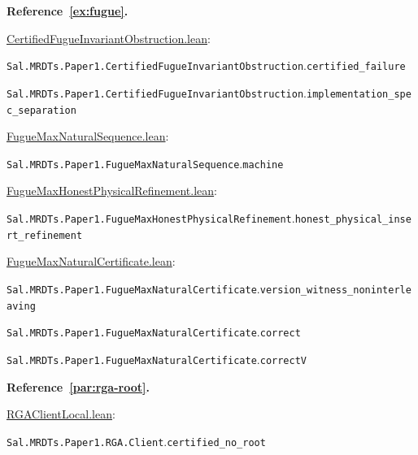 \medskip\noindent\textbf{Reference~\ref{ex:fugue}.}\par\nobreak
\noindent\href{https://github.com/fplaunchpad/sal/blob/paper1/Sal/MRDTs/Paper1/CertifiedFugueInvariantObstruction.lean}{CertifiedFugueInvariantObstruction.lean}:\par
{\small\nolinkurl{Sal.MRDTs.Paper1.CertifiedFugueInvariantObstruction}.\allowbreak\nolinkurl{certified_failure}}\par
{\small\nolinkurl{Sal.MRDTs.Paper1.CertifiedFugueInvariantObstruction}.\allowbreak\nolinkurl{implementation_spec_separation}}\par
\noindent\href{https://github.com/fplaunchpad/sal/blob/paper1/Sal/MRDTs/Paper1/FugueMaxNaturalSequence.lean}{FugueMaxNaturalSequence.lean}:\par
{\small\nolinkurl{Sal.MRDTs.Paper1.FugueMaxNaturalSequence}.\allowbreak\nolinkurl{machine}}\par
\noindent\href{https://github.com/fplaunchpad/sal/blob/paper1/Sal/MRDTs/Paper1/FugueMaxHonestPhysicalRefinement.lean}{FugueMaxHonestPhysicalRefinement.lean}:\par
{\small\nolinkurl{Sal.MRDTs.Paper1.FugueMaxHonestPhysicalRefinement}.\allowbreak\nolinkurl{honest_physical_insert_refinement}}\par
\noindent\href{https://github.com/fplaunchpad/sal/blob/paper1/Sal/MRDTs/Paper1/FugueMaxNaturalCertificate.lean}{FugueMaxNaturalCertificate.lean}:\par
{\small\nolinkurl{Sal.MRDTs.Paper1.FugueMaxNaturalCertificate}.\allowbreak\nolinkurl{version_witness_noninterleaving}}\par
{\small\nolinkurl{Sal.MRDTs.Paper1.FugueMaxNaturalCertificate}.\allowbreak\nolinkurl{correct}}\par
{\small\nolinkurl{Sal.MRDTs.Paper1.FugueMaxNaturalCertificate}.\allowbreak\nolinkurl{correctV}}\par

\medskip\noindent\textbf{Reference~\ref{par:rga-root}.}\par\nobreak
\noindent\href{https://github.com/fplaunchpad/sal/blob/paper1/Sal/MRDTs/Paper1/RGAClientLocal.lean}{RGAClientLocal.lean}:\par
{\small\nolinkurl{Sal.MRDTs.Paper1.RGA.Client}.\allowbreak\nolinkurl{certified_no_root}}\par

